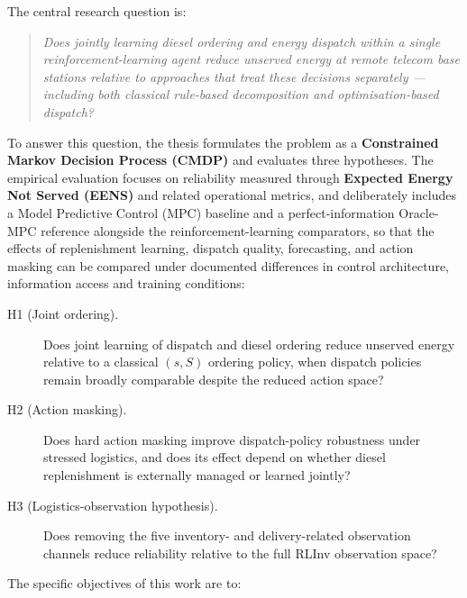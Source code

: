 The central research question is:

\begin{quote}
\emph{Does jointly learning diesel ordering and energy dispatch within a single
reinforcement-learning agent reduce unserved energy at remote telecom
base stations relative to approaches that treat these decisions separately ---
including both classical rule-based decomposition and optimisation-based
dispatch?}
\end{quote}

To answer this question, the thesis formulates the problem as a
\textbf{Constrained Markov Decision Process (CMDP)} and evaluates three
hypotheses. The empirical evaluation focuses on reliability
measured through \textbf{Expected Energy Not Served (EENS)} and related
operational metrics, and deliberately includes a Model Predictive Control
(MPC) baseline and a perfect-information Oracle-MPC reference alongside the
reinforcement-learning comparators, so that the effects of replenishment
learning, dispatch quality, forecasting, and action masking can be
compared under documented differences in control architecture, information access and training conditions:

\begin{description}
  \item[H1 (Joint ordering).] Does joint learning of dispatch and diesel
  ordering reduce unserved energy relative to a classical $(s,S)$ ordering
  policy, when dispatch policies remain broadly comparable despite the
  reduced action space?
\item[H2 (Action masking).] Does hard action masking improve dispatch-policy
robustness under stressed logistics, and does its effect depend on whether
diesel replenishment is externally managed or learned jointly?
  \item[H3 (Logistics-observation hypothesis).] Does removing the five inventory- and
  delivery-related observation channels reduce reliability relative to the
  full RLInv observation space?
\end{description}

The specific objectives of this work are to:

